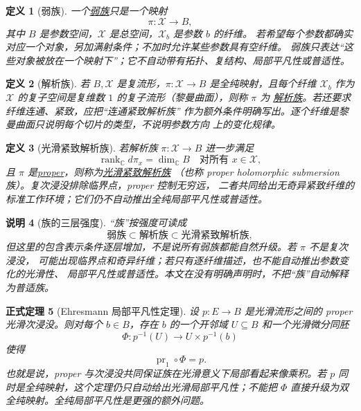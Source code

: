 \documentclass[UTF8,fontset=none,a4paper,11pt]{ctexart}
\theoremstyle{foundation-definition}
\newtheorem{definition}{定义}[section]
\theoremstyle{foundation-theorem}
\newtheorem{theorem}[definition]{正式定理}
\theoremstyle{foundation-proposition}
\theoremstyle{foundation-example}
\theoremstyle{foundation-remark}
\newtheorem{remark}[definition]{说明}
\theoremstyle{foundation-theorem}
\newcommand{\term}[2]{\hyperref[#1]{#2}}
\begin{document}
\begin{definition}[弱族]\label{def:weak-family}
一个\term{def:weak-family}{弱族}只是一个映射
\[
\pi:\mathcal X\to B,\qquad
\]
其中 \(B\) 是参数空间，\(\mathcal X\) 是总空间，\(\mathcal X_b\) 是参数 \(b\) 的纤维。
若希望每个参数都确实对应一个对象，另加满射条件；不加时允许某些参数具有空纤维。
弱族只表达“这些对象被放在一个映射下”；它不自动带有拓扑、复结构、局部平凡性或普适性。
\end{definition}

\begin{definition}[解析族]\label{def:analytic-family}
若 \(B,\mathcal X\) 是复流形，\(\pi:\mathcal X\to B\) 是全纯映射，且每个纤维
\(\mathcal X_b\) 作为 \(\mathcal X\) 的复子空间是复维数 \(1\) 的复子流形（黎曼曲面），则称 \(\pi\) 为
\term{def:analytic-family}{解析族}。若还要求纤维连通、紧致，应把“连通紧致解析族”
作为额外条件明确写出。逐个纤维是黎曼曲面只说明每个切片的类型，不说明参数方向
上的变化规律。
\end{definition}

\begin{definition}[光滑紧致解析族]\label{def:smooth-compact-analytic-family}
若解析族 \(\pi:\mathcal X\to B\) 进一步满足
\[
\operatorname{rank}_{\mathbb C}d\pi_x=\dim_{\mathbb C}B
\quad\text{对所有 }x\in\mathcal X,
\]
且 \(\pi\) 是\term{def:proper-map}{proper}，则称为\term{def:smooth-compact-analytic-family}{光滑紧致解析族}
（也称 proper holomorphic submersion 族）。复次浸没排除临界点，proper 控制无穷远，
二者共同给出无奇异紧致纤维的标准工作环境；它们仍不自动推出全纯局部平凡性或普适性。
\end{definition}

\begin{remark}[族的三层强度]\label{rem:family-strengths}
“族”按强度可读成
\[
\text{弱族}\subset\text{解析族}\subset\text{光滑紧致解析族},
\]
但这里的包含表示条件逐层增加，不是说所有弱族都能自然升级。若 \(\pi\) 不是复次浸没，
可能出现临界点和奇异纤维；若只有逐纤维描述，也不能自动推出参数变化的光滑性、
局部平凡性或普适性。本文在没有明确声明时，不把“族”自动解释为普适族。
\end{remark}

\begin{theorem}[Ehresmann 局部平凡性定理]\label{thm:ehresmann}
设 \(p:E\to B\) 是光滑流形之间的 proper 光滑次浸没。则对每个 \(b\in B\)，存在 \(b\) 的一个开邻域 \(U\subseteq B\) 和一个光滑微分同胚
\[
  \Phi:p^{-1}(U)\longrightarrow U\times p^{-1}(b)
\]
使得
\[
  \operatorname{pr}_1\circ\Phi=p.
\]
也就是说，proper 与次浸没共同保证族在光滑意义下局部看起来像乘积。若 \(p\) 同时是全纯映射，这个定理仍只自动给出光滑局部平凡性；不能把 \(\Phi\) 直接升级为双全纯映射。全纯局部平凡性是更强的额外问题。
\end{theorem}
\end{document}
